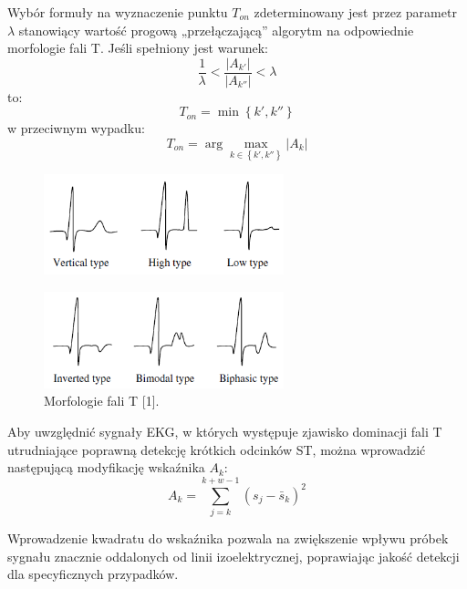 Wybór formuły na wyznaczenie punktu $ T_{on} $ zdeterminowany jest przez parametr $ \lambda $ stanowiący wartość progową „przełączającą” algorytm na odpowiednie morfologie fali T. Jeśli spełniony jest warunek:
\begin{equation}
	\frac{1}{\lambda} < \frac{\left| A_{k'} \right| }{\left| A_{k''} \right| } < \lambda
\end{equation}
to:
\begin{equation}
	T_{on} = \min \left\lbrace k', k'' \right\rbrace 
\end{equation}
w przeciwnym wypadku:
\begin{equation}
	T_{on} = \arg \max_{k \in \left\lbrace k', k'' \right\rbrace } \left| A_k \right| 
\end{equation}
\begin{figure}[H]
	\centering
	\includegraphics[width=0.62\textwidth]{ST_INTERVAL/img/ST_morfologieT1.png}
	\label{fig:ST_morfologieT1}
\end{figure}
\begin{figure}[H]
	\centering
	\includegraphics[width=0.62\textwidth]{ST_INTERVAL/img/ST_morfologieT2.png}
	\caption{Morfologie fali T [1].}
	\label{fig:ST_morfologieT2}
\end{figure}
Aby uwzględnić sygnały EKG, w których występuje zjawisko dominacji fali T utrudniające poprawną detekcję krótkich odcinków ST, można wprowadzić następującą modyfikację wskaźnika $ A_k $:
\begin{equation}
	A_k = \sum_{j=k}^{k+w-1} \left( s_j-\bar{s}_k \right)^2
\end{equation}

Wprowadzenie kwadratu do wskaźnika pozwala na zwiększenie wpływu próbek sygnału znacznie oddalonych od linii izoelektrycznej, poprawiając jakość detekcji dla specyficznych przypadków.

